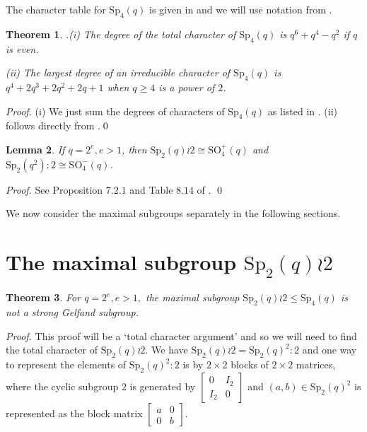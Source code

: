 \documentclass[10pt,a4paper]{amsart}
\newtheorem{thm}{Theorem}[section]
\newtheorem{lem}[thm]{Lemma}
\theoremstyle{plain}
\theoremstyle{definition}
\numberwithin{equation}{section}
\begin{document}
The character table for $\mathrm{Sp}_4(q)$ is given in \cite{speven} and  we will use notation from \cite{speven}. 

\begin{thm}  \cite{speven}.\label{lem:totalsymplectic}  (i) The degree of the total character of $\mathrm{Sp}_4(q)$ is $q^6+q^4-q^2$ if $q$ is even.

(ii) The largest degree of an irreducible character of $\mathrm{Sp}_4(q)$ is $q^4+2q^3+2q^2+2q+1$ when $q\geq 4$ is a power of $2$.
\end{thm}
\noindent\textit{Proof.} (i) We just  sum  the degrees of characters of $\mathrm{Sp}_4(q)$ as listed in \cite{speven}. (ii) follows directly from \cite {speven}.\qed\medskip


\begin{lem}\label{isomorpicmaximal}
If $q=2^e, e>1$, then $\mathrm{Sp}_2(q)\wr 2 \cong \mathrm{SO}_4^+(q)$  and $\mathrm{Sp}_2(q^2)\colon 2 \cong \mathrm{SO}_4^-(q)$.
\end{lem}
\noindent\textit{Proof.} 
See Proposition $7.2.1$  and Table $8.14$ of \cite{max}.  \qed\medskip 


We now consider the maximal subgroups separately in the following sections.

\section { The maximal subgroup $\mathrm{Sp}_2(q)\wr 2 $}


\begin{thm}\label{wreath}
For $q=2^e, e>1,$ the maximal subgroup $\mathrm{Sp}_2(q)\wr 2 \leq \mathrm{Sp}_4(q)$ is not a strong Gelfand subgroup.
\end{thm}
\noindent\textit{Proof.} This proof will be a `total character argument' and so we will need to find the total character of
$\mathrm{Sp}_2(q)\wr 2$. 
We have $\mathrm{Sp}_2(q)\wr 2 = \mathrm{Sp}_2(q)^2: 2$ and one way to  represent the elements of $\mathrm{Sp}_2(q)^2: 2$ is by $2 \times 2$ blocks of $2 \times 2$ matrices, where the cyclic  subgroup $2$ is generated  by  $\begin{bmatrix} 0&I_2\\I_2&0\end{bmatrix}$ and
$(a,b) \in \mathrm{Sp}_2(q)^2$ is represented as the block matrix 
$\begin{bmatrix} a&0\\0&b\end{bmatrix}.$ 
 
\end{document}
